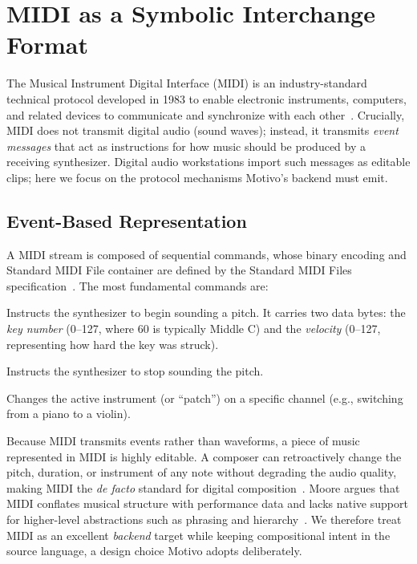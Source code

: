\section{MIDI as a Symbolic Interchange Format}\label{sec:midi-background}

The Musical Instrument Digital Interface (MIDI) is an industry-standard technical protocol developed in 1983
to enable electronic instruments, computers, and related devices to communicate and synchronize with each
other~\cite{Moog_1986}.
Crucially, MIDI does not transmit digital audio (sound waves); instead, it transmits \textit{event messages} that act as
instructions for how music should be produced by a receiving synthesizer.
Digital audio workstations import such messages as editable clips; here we focus on the protocol mechanisms
Motivo's backend must emit.

\subsection{Event-Based Representation}\label{detail-subsec:event-based-representation}

A MIDI stream is composed of sequential commands, whose binary encoding and Standard MIDI File container are defined by
the Standard MIDI Files specification~\cite{MMA_SMF_1996}.
The most fundamental commands are:

 Instructs the synthesizer to begin sounding a pitch.
It carries two data bytes: the \textit{key number} (0--127, where 60 is typically Middle C) and the
\textit{velocity} (0--127, representing how hard the key was struck).

 Instructs the synthesizer to stop sounding the pitch.

 Changes the active instrument (or ``patch'') on a specific channel (e.g., switching
from a piano to a violin).

Because MIDI transmits events rather than waveforms, a piece of music represented in MIDI is highly editable.
A composer can retroactively change the pitch, duration, or instrument of any note without degrading the audio quality,
making MIDI the \textit{de facto} standard for digital composition~\cite{Moog_1986}.
Moore argues that MIDI conflates musical structure with performance data and lacks native support for higher-level
abstractions such as phrasing and hierarchy~\cite{Moore_1988}.
We therefore treat MIDI as an excellent \textit{backend} target while keeping compositional intent in the source
language, a design choice Motivo adopts deliberately.

